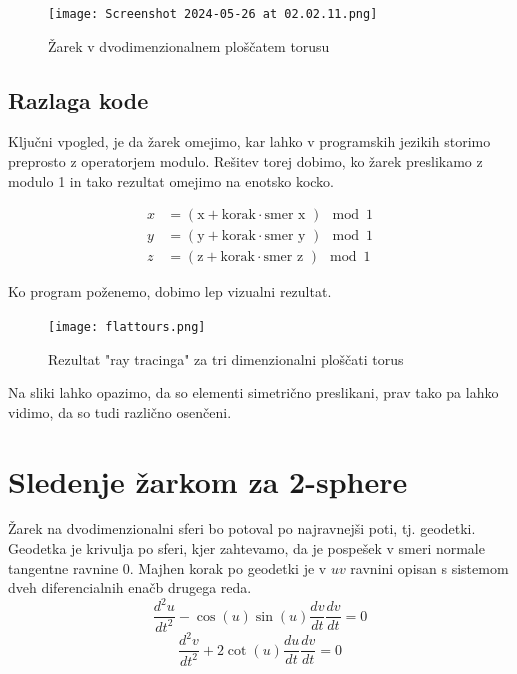 \documentclass[titlepage]{article}
\begin{document}
\begin{figure}[H]
    \centering
    \texttt{[image: Screenshot 2024-05-26 at 02.02.11.png]}
    \caption{Žarek v dvodimenzionalnem ploščatem torusu}
    \label{Slika:Žarek v dvodimenzionalnem ploščatem torusu}
\end{figure}



\subsection{Razlaga kode}

Ključni vpogled, je da žarek omejimo, kar lahko v programskih jezikih storimo preprosto z operatorjem modulo. Rešitev torej dobimo, ko žarek preslikamo z modulo 1 in tako rezultat omejimo na enotsko kocko.
        
\begin{align*}
x &= \left( \text{x} + \text{korak} \cdot \text{smer x }\right) \mod 1 \\
y &= \left( \text{y} + \text{korak} \cdot \text{smer y }\right) \mod 1 \\
z &= \left( \text{z} + \text{korak} \cdot \text{smer z }\right) \mod 1
\end{align*}

Ko program poženemo, dobimo lep vizualni rezultat.
\begin{figure}[H]
    \centering
    \texttt{[image: flattours.png]}
    \caption{Rezultat "ray tracinga" za tri dimenzionalni ploščati torus}
    \label{Slika:Rezultat "ray tracinga" za tri dimenzionalni ploščati torus}
\end{figure}
Na sliki lahko opazimo, da so elementi simetrično preslikani, prav tako pa lahko vidimo, da so tudi različno osenčeni.


\section{Sledenje žarkom za 2-sphere}
Žarek na dvodimenzionalni sferi bo potoval po najravnejši poti, tj. geodetki. Geodetka je krivulja po sferi, kjer zahtevamo, da je 
pospešek v smeri normale tangentne ravnine 0. Majhen korak po geodetki je v $uv$ ravnini opisan s sistemom dveh diferencialnih enačb drugega reda.
\begin{equation}
    \frac{d^{2}u}{dt^{2}}-\cos(u)\sin(u)\frac{dv}{dt}\frac{dv}{dt}=0
\end{equation}
\begin{equation}
    \frac{d^{2}v}{dt^{2}}+2\cot(u)\frac{du}{dt}\frac{dv}{dt}=0
\end{equation}
\end{document}
